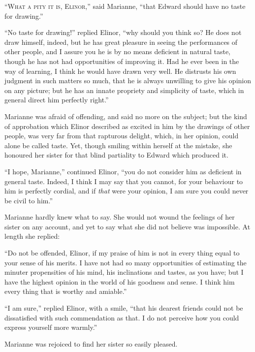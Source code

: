 \documentclass{article}
\newcommand{\gintro}[1]{\textcolor{gcolor}{\textsc{#1}}}
\begin{document}
\gintro{``What a pity it is, Elinor,''} said Marianne,
``that Edward should have no taste for drawing.''

``No taste for drawing!'' replied Elinor, ``why should
you think so? He does not draw himself, indeed, but he has
great pleasure in seeing the performances of other people,
and I assure you he is by no means deficient in natural taste,
though he has not had opportunities of improving it.
Had he ever been in the way of learning, I think he would
have drawn very well.  He distrusts his own judgment
in such matters so much, that he is always unwilling
to give his opinion on any picture; but he has an innate
propriety and simplicity of taste, which in general
direct him perfectly right.''

Marianne was afraid of offending, and said no more
on the subject; but the kind of approbation which Elinor
described as excited in him by the drawings of other
people, was very far from that rapturous delight, which,
in her opinion, could alone be called taste.  Yet, though
smiling within herself at the mistake, she honoured
her sister for that blind partiality to Edward which produced it.

``I hope, Marianne,'' continued Elinor, ``you do not
consider him as deficient in general taste.  Indeed, I think
I may say that you cannot, for your behaviour to him
is perfectly cordial, and if \emph{that} were your opinion,
I am sure you could never be civil to him.''

Marianne hardly knew what to say.  She would
not wound the feelings of her sister on any account,
and yet to say what she did not believe was impossible.
At length she replied:

``Do not be offended, Elinor, if my praise of him
is not in every thing equal to your sense of his merits.
I have not had so many opportunities of estimating the minuter
propensities of his mind, his inclinations and tastes,
as you have; but I have the highest opinion in the world
of his goodness and sense.  I think him every thing that is
worthy and amiable.''

``I am sure,'' replied Elinor, with a smile,
``that his dearest friends could not be dissatisfied
with such commendation as that.  I do not perceive
how you could express yourself more warmly.''

Marianne was rejoiced to find her sister so easily pleased.
\end{document}
